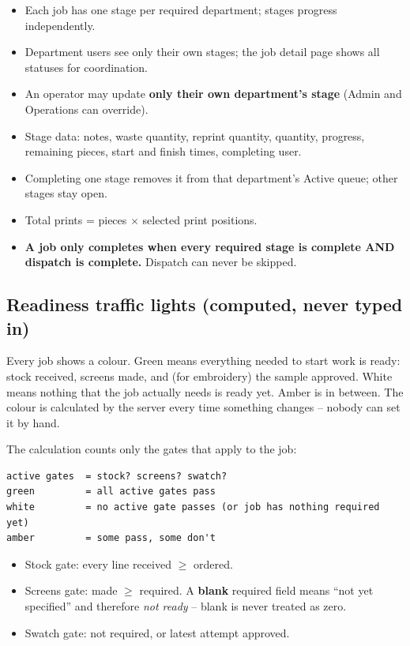 \begin{itemize}
  \item Each job has one stage per required department; stages progress independently.
  \item Department users see only their own stages; the job detail page shows all
        statuses for coordination.
  \item An operator may update \textbf{only their own department's stage} (Admin and
        Operations can override).
  \item Stage data: notes, waste quantity, reprint quantity, quantity, progress,
        remaining pieces, start and finish times, completing user.
  \item Completing one stage removes it from that department's Active queue; other
        stages stay open.
  \item Total prints = pieces $\times$ selected print positions.
  \item \textbf{A job only completes when every required stage is complete AND dispatch
        is complete.} Dispatch can never be skipped.
\end{itemize}

\subsection{Readiness traffic lights (computed, never typed in)}

\begin{plainwords}
Every job shows a colour. Green means everything needed to start work is ready: stock
received, screens made, and (for embroidery) the sample approved. White means nothing
that the job actually needs is ready yet. Amber is in between. The colour is calculated
by the server every time something changes -- nobody can set it by hand.
\end{plainwords}

The calculation counts only the gates that apply to the job:

\begin{verbatim}
active gates  = stock? screens? swatch?
green         = all active gates pass
white         = no active gate passes (or job has nothing required yet)
amber         = some pass, some don't
\end{verbatim}

\begin{itemize}
  \item Stock gate: every line received $\ge$ ordered.
  \item Screens gate: made $\ge$ required. A \textbf{blank} required field means
        ``not yet specified'' and therefore \emph{not ready} -- blank is never treated
        as zero.
  \item Swatch gate: not required, or latest attempt approved.
\end{itemize}

